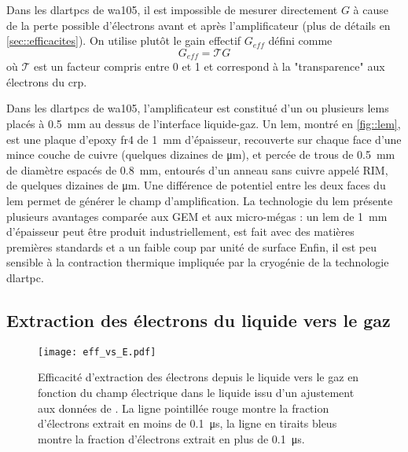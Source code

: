       Dans les \glspl{dlartpc} de \gls{wa105}, il est impossible de mesurer directement $G$ à cause de la perte possible d'électrons avant et après l'amplificateur (plus de détails en \autoref{sec::efficacites}). On utilise plutôt le gain effectif $G_{eff}$ défini comme
      \begin{equation}\label{eq::gain_eff}
        G _{eff}= \mathcal{T}G
      \end{equation}
      où $\mathcal{T}$ est un facteur compris entre 0 et 1 et correspond à la "transparence" aux électrons du \gls{crp}. 

      Dans les \glspl{dlartpc} de \gls{wa105}, l'amplificateur est constitué d'un ou plusieurs \glspl{lem} placés à \SI{0.5}{\milli\meter} au dessus de l'interface liquide-gaz. Un \gls{lem}, montré en \autoref{fig::lem}, est une plaque d'epoxy \gls{fr4} de \SI{1}{\milli\meter} d'épaisseur, recouverte sur chaque face d'une mince couche de cuivre (quelques dizaines de \si{\micro\meter}), et percée de trous de \SI{0.5}{\milli\meter} de diamètre espacés de \SI{0.8}{\milli\meter}, entourés d'un anneau sans cuivre appelé RIM, de quelques dizaines de \si{\micro\meter}. Une différence de potentiel entre les deux faces du \gls{lem} permet de générer le champ d'amplification. La technologie du \gls{lem} présente plusieurs avantages comparée aux GEM et aux micro-mégas : un \gls{lem} de \SI{1}{\milli\meter} d'épaisseur peut être produit industriellement, est fait avec des matières premières standards et a un faible coup par unité de surface Enfin, il est peu sensible à la contraction thermique impliquée par la cryogénie de la technologie \gls{dlartpc}.

    \subsection{Extraction des électrons du liquide vers le gaz}\label{sec::extraction}

      \begin{figure}[!htb]
        \centering
        \texttt{[image: eff\_vs\_E.pdf]}
        \caption[Efficacité d'extraction en fonction du champ électrique]{\label{fig::guschin}Efficacité d'extraction des électrons depuis le liquide vers le gaz en fonction du champ électrique dans le liquide issu d'un ajustement aux données de \cite{guschin}. La ligne pointillée rouge montre la fraction d'électrons extrait en moins de \SI{0.1}{\micro\second}, la ligne en tiraits bleus montre la fraction d'électrons extrait en plus de \SI{0.1}{\micro\second}.}
      \end{figure}

